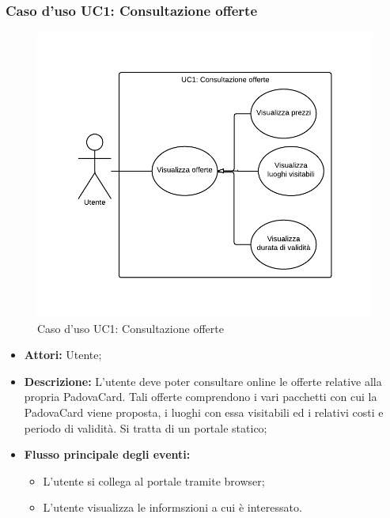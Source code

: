 \subsubsection{Caso d'uso UC1: Consultazione offerte}\label{UC1}
\begin{figure}[H]
\centering
\includegraphics[width=1\textwidth]{images/UC1.png}
\caption{Caso d'uso UC1: Consultazione offerte}
\end{figure}
\begin{itemize}
\item \textbf{Attori:} Utente;
\item \textbf{Descrizione:} L'utente deve poter consultare online le offerte relative alla propria PadovaCard. Tali offerte comprendono i vari pacchetti con cui la PadovaCard viene proposta, i luoghi con essa visitabili ed i relativi costi e periodo di validità. Si tratta di un portale statico;

\item \textbf{Flusso principale degli eventi:}
	\begin{itemize}
		\item L'utente si collega al portale tramite browser;
		\item L'utente visualizza le informszioni a cui è interessato.
	\end{itemize}
\end{itemize}


